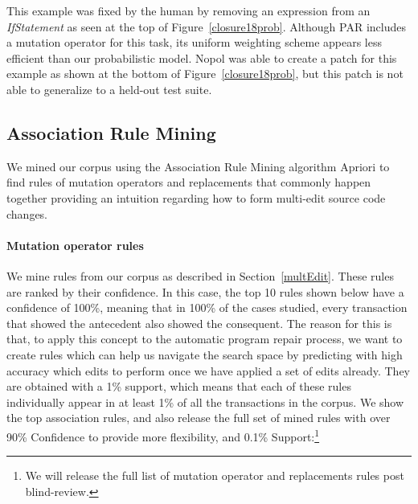 \documentclass[conference]{IEEEtran}
\begin{document}
This example was fixed by the human by removing an expression from an
\emph{IfStatement} as seen at the top of Figure~\ref{closure18prob}. 
Although PAR includes a mutation operator for this task, its uniform
weighting scheme appears less efficient than our probabilistic model. Nopol was
able to create a patch for this example as shown at the bottom of 
Figure~\ref{closure18prob}, but this patch is not able to generalize to a
held-out test suite.

\subsection{Association Rule Mining} \label{armRes}

We mined our corpus using the Association Rule Mining algorithm Apriori 
to find rules of mutation operators and 
replacements that commonly happen together providing an intuition regarding
how to form multi-edit
source code changes.

\paragraph{Mutation operator rules}
We mine rules from our corpus as described in Section~\ref{multEdit}.  
These rules are ranked by their confidence. In this case, the top 10 rules shown
below have a confidence of 100\%, meaning that in 100\% of the cases
studied, every transaction that showed the antecedent also showed the consequent. The reason
for this is that, to apply this concept to the automatic program repair process,
we want to create rules which can help us navigate the search space by predicting 
with high accuracy which edits to perform once we 
have applied a set of edits already.
They are obtained with a 1\% support, which means that each of these rules
individually appear in at least 1\% of all the transactions in the
corpus. We show the top association rules, and also release the full set of mined
rules with over 90\% Confidence to provide more flexibility, and 0.1\% Support:\footnote{We will release the full list of mutation operator and replacements rules post blind-review.} %

\end{document}
